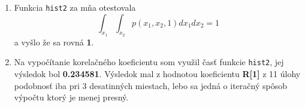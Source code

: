 \documentclass[11pt, a4paper,twocolumn]{article}
\begin{document}
\begin{enumerate}
    \item
    {
        Funkcia \texttt{hist2} za mňa otestovala $$ \int_{x_1} \int_{x_2} p(x_1,x_2,1)dx_1dx_2 = 1$$ a vyšlo že sa rovná \textbf{1}.
    }

    \item
    {
        Na vypočítanie korelačného koeficientu som využil časť funkcie \texttt{hist2}, jej výsledok bol \textbf{0.234581}. Výsledok mal z hodnotou koeficientu \textbf{R[1]} z 11 úlohy podobnosť iba pri 3 desatinných miestach, lebo sa jedná o iteračný spôsob výpočtu ktorý je menej presný.

    }
\end{enumerate}
\end{document}
